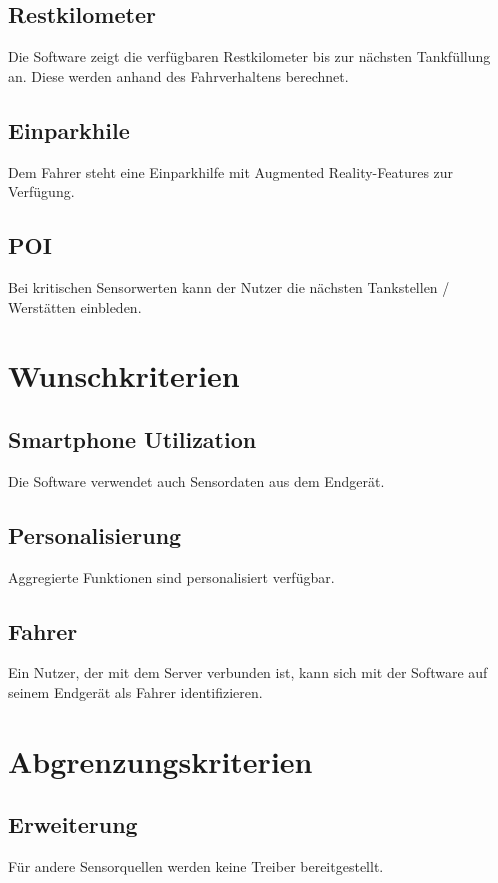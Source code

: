 \documentclass[pflichtenheft.tex]{subfiles}
\begin{document}
\subsection{\mknr Restkilometer} Die Software zeigt die verfügbaren Restkilometer bis zur nächsten Tankfüllung an. Diese werden anhand des Fahrverhaltens berechnet.

\subsection{\mknr Einparkhile} Dem Fahrer steht eine Einparkhilfe mit Augmented Reality-Features zur Verfügung.

\subsection{\mknr POI} Bei kritischen Sensorwerten kann der Nutzer die nächsten Tankstellen / Werstätten einbleden.


\section{Wunschkriterien}


\subsection{\mknr Smartphone Utilization} Die Software verwendet auch Sensordaten aus dem Endgerät.

\subsection{\mknr Personalisierung} Aggregierte Funktionen sind personalisiert verfügbar.

\subsection{\mknr Fahrer} Ein Nutzer, der mit dem Server verbunden ist, kann sich mit der Software auf seinem Endgerät als Fahrer identifizieren.

\section{Abgrenzungskriterien}

\subsection{\mknr Erweiterung} Für andere Sensorquellen werden keine Treiber bereitgestellt.
\end{document}

